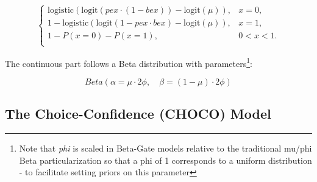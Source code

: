 \documentclass[
  jou,
  floatsintext,
  longtable,
  nolmodern,
  notxfonts,
  notimes,
  colorlinks=true,linkcolor=blue,citecolor=blue,urlcolor=blue]{apa7}
\begin{document}
\[
\begin{cases}
\mathrm{logistic}\left( \mathrm{logit}(pex \cdot (1 - bex)) - \mathrm{logit}(\mu) \right), & x = 0, \\[6pt]
1 - \mathrm{logistic}\left( \mathrm{logit}(1 - pex \cdot bex) - \mathrm{logit}(\mu) \right), & x = 1, \\[6pt]
1 - P(x = 0) - P(x = 1), & 0 < x < 1. \\
\end{cases}
\]

The continuous part follows a Beta distribution with
parameters\footnote{Note that \emph{phi} is scaled in Beta-Gate models
  relative to the traditional mu/phi Beta particularization so that a
  phi of 1 corresponds to a uniform distribution - to facilitate setting
  priors on this parameter}:

\[
Beta(\alpha = \mu \cdot 2 \phi, \quad \beta = (1 - \mu) \cdot 2 \phi)
\]

\subsection{The Choice-Confidence (CHOCO)
Model}\label{the-choice-confidence-choco-model}
\end{document}
